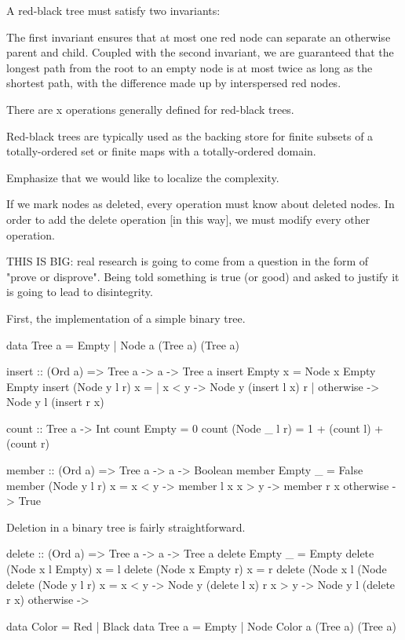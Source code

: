 \documentclass[preprint]{sigplanconf}
\begin{document}
A red-black tree must satisfy two invariants:



The first invariant ensures that at most one red node can separate an otherwise parent and child. Coupled with the second invariant, we are guaranteed that the longest path from the root to an empty node is at most twice as long as the shortest path, with the difference made up by interspersed red nodes.

There are x operations generally defined for red-black trees.

Red-black trees are typically used as the backing store for finite subsets of 
a totally-ordered set or finite maps with a totally-ordered domain.

Emphasize that we would like to localize the complexity.

If we mark nodes as deleted, every operation must know about deleted nodes.
In order to add the delete operation [in this way], we must modify every 
other operation.

THIS IS BIG: real research is going to come from a question in the form of
"prove or disprove". Being told something is true (or good) and asked to 
justify it is going to lead to disintegrity.

First, the implementation of a simple binary tree.

data Tree a = Empty | Node a (Tree a) (Tree a)

insert :: (Ord a) => Tree a -> a -> Tree a
insert Empty x = Node x Empty Empty
insert (Node y l r) x = | x < y     -> Node y (insert l x) r
                        | otherwise -> Node y l (insert r x)

count :: Tree a -> Int
count Empty = 0
count (Node \_ l r) = 1 + (count l) + (count r)

member :: (Ord a) => Tree a -> a -> Boolean
member Empty \_ = False
member (Node y l r) x = x < y     -> member l x
                        x > y     -> member r x
                        otherwise -> True

Deletion in a binary tree is fairly straightforward.

delete :: (Ord a) => Tree a -> a -> Tree a
delete Empty \_ = Empty
delete (Node x l Empty) x = l
delete (Node x Empty r) x = r
delete (Node x l (Node
delete (Node y l r) x = x < y     -> Node y (delete l x) r
                        x > y     -> Node y l (delete r x)
                        otherwise ->

data Color = Red | Black
data Tree a = Empty | Node Color a (Tree a) (Tree a)
\end{document}
